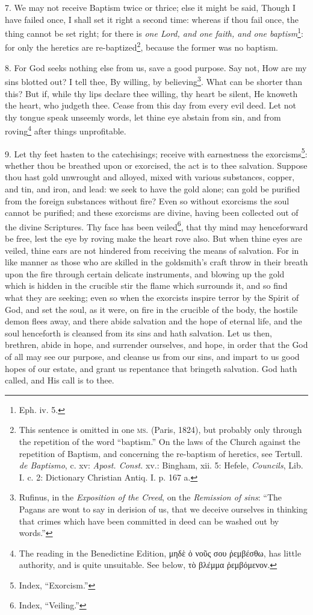 7. We may not receive Baptism twice or thrice; else it might be said, Though I have failed once, I shall set it right a second time: whereas if thou fail once, the thing cannot be set right; for there is \emph{one Lord, and one faith, and one baptism}\footnote{Eph. iv. 5.}: for only the heretics are re-baptized\footnote{This sentence is omitted in one \textsc{ms.} (Paris, 1824), but probably only through the repetition of the word “baptism.” On the laws of the Church against the repetition of Baptism, and concerning the re-baptism of heretics, see Tertull. \emph{de Baptismo}, c. xv: \emph{Apost. Const.} xv.: Bingham, xii. 5: Hefele, \emph{Councils}, Lib. I. c. 2: Dictionary Christian Antiq. I. p. 167 a.}, because the former was no baptism.

8. For God seeks nothing else from us, save a good purpose. Say not, How are my sins blotted out? I tell thee, By willing, by believing\footnote{Rufinus, in the \emph{Exposition of the Creed}, on the \emph{Remission of sins}: “The Pagans are wont to say in derision of us, that we deceive ourselves in thinking that crimes which have been committed in deed can be washed out by words.”}. What can be shorter than this? But if, while thy lips declare thee willing, thy heart be silent, He knoweth the heart, who judgeth thee. Cease from this day from every evil deed. Let not thy tongue speak unseemly words, let thine eye abstain from sin, and from roving\footnote{The reading in the Benedictine Edition, \textgreek{μηδὲ ὁ νοῦς σου ῥεμβέσθω}, has little authority, and is quite unsuitable. See below, \textgreek{τὸ βλέμμα ῥεμβόμενον}.} after things unprofitable.

9. Let thy feet hasten to the catechisings; receive with earnestness the exorcisms\footnote{Index, “Exorcism.”}: whether thou be breathed upon or exorcised, the act is to thee salvation. Suppose thou hast gold unwrought and alloyed, mixed with various substances, copper, and tin, and iron, and lead: we seek to have the gold alone; can gold be purified from the foreign substances without fire? Even so without exorcisms the soul cannot be purified; and these exorcisms are divine, having been collected out of the divine Scriptures. Thy face has been veiled\footnote{Index, “Veiling.”}, that thy mind may henceforward be free, lest the eye by roving make the heart rove also. But when thine eyes are veiled, thine ears are not hindered from receiving the means of salvation. For in like manner as those who are skilled in the goldsmith’s craft throw in their breath upon the fire through certain delicate instruments, and blowing up the gold which is hidden in the crucible stir the flame which surrounds it, and so find what they are seeking; even so when the exorcists inspire terror by the Spirit of God, and set the soul, as it were, on fire in the crucible of the body, the hostile demon flees away, and there abide salvation and the hope of eternal life, and the soul henceforth is cleansed from its sins and hath salvation. Let us then, brethren, abide in hope, and surrender ourselves, and hope, in order that the God of all may see our purpose, and cleanse us from our sins, and impart to us good hopes of our estate, and grant us repentance that bringeth salvation. God hath called, and His call is to thee.

